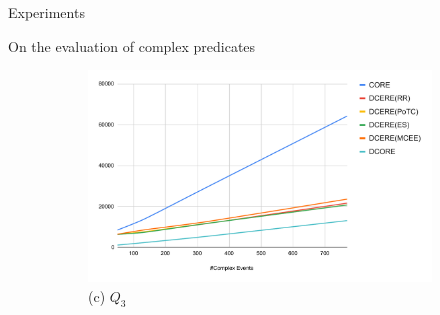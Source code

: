 \documentclass[xcolor=pdftex,dvipsnames,table]{beamer}
\begin{document}
\begin{frame}{Experiments}
\begin{block}{On the evaluation of complex predicates}
\begin{figure}[H]
\begin{center}
\begin{subfigure}[b]{0.40\textwidth}
              \includegraphics[width=\textwidth]{experiment_1_chart_3}
              \tiny (c) $Q_{3}$
          \end{subfigure}
        \end{center}
    \end{figure}
  \end{block}
\end{frame}

\end{document}
